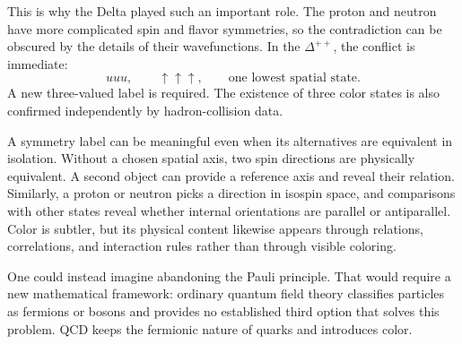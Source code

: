 \begin{classroomqa}
\end{classroomqa}


\begin{classroomqa}
\end{classroomqa}

This is why the Delta played such an important role. The proton and neutron have more complicated spin and flavor symmetries, so the contradiction can be obscured by the details of their wavefunctions. In the \(\Delta^{++}\), the conflict is immediate:
\begin{equation}
uuu,\qquad
\uparrow\uparrow\uparrow,
\qquad
\text{one lowest spatial state}.
\end{equation}
A new three-valued label is required. The existence of three color states is also confirmed independently by hadron-collision data.

A symmetry label can be meaningful even when its alternatives are equivalent in isolation. Without a chosen spatial axis, two spin directions are physically equivalent. A second object can provide a reference axis and reveal their relation. Similarly, a proton or neutron picks a direction in isospin space, and comparisons with other states reveal whether internal orientations are parallel or antiparallel. Color is subtler, but its physical content likewise appears through relations, correlations, and interaction rules rather than through visible coloring.

One could instead imagine abandoning the Pauli principle. That would require a new mathematical framework: ordinary quantum field theory classifies particles as fermions or bosons and provides no established third option that solves this problem. QCD keeps the fermionic nature of quarks and introduces color.


